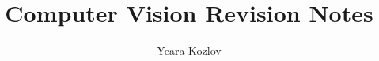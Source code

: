 \graphicspath{{computer_vision}{computer_vision/image_proc/}{computer_vision/event_cameras/}{computer_vision/cv/}}




\title{Computer Vision Revision Notes}
\author{Yeara Kozlov}
\date{}

\maketitle

\tableofcontents
\cleardoublepage









